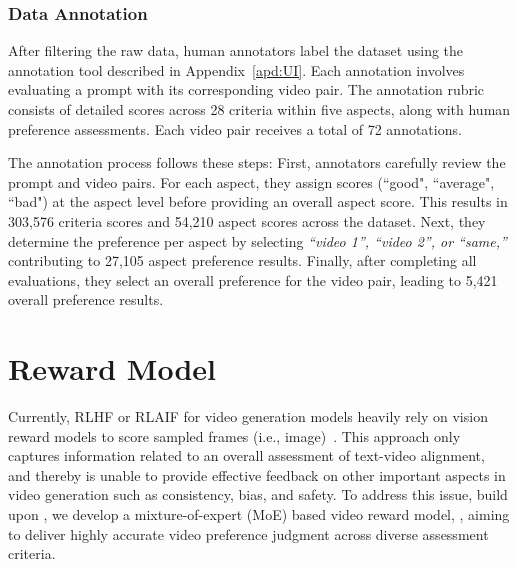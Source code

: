 





\subsubsection{Data Annotation}
After filtering the raw data, human annotators label the dataset using the annotation tool described in Appendix~\ref{apd:UI}. Each annotation involves evaluating a prompt with its corresponding video pair. The annotation rubric consists of detailed scores across 28 criteria within five aspects, along with human preference assessments. Each video pair receives a total of 72 annotations.  

The annotation process follows these steps: First, annotators carefully review the prompt and video pairs. For each aspect, they assign scores (``good", ``average", ``bad") at the aspect level before providing an overall aspect score. This results in 303,576 criteria scores and 54,210 aspect scores across the dataset. Next, they determine the preference per aspect by selecting \textit{``video 1'', ``video 2'', or ``same,''} contributing to 27,105 aspect preference results. Finally, after completing all evaluations, they select an overall preference for the video pair, leading to 5,421 overall preference results.  





\section{\algname Reward Model}
\label{sec:alg}

Currently, RLHF or RLAIF for video generation models heavily rely on vision reward models to score sampled frames (i.e., image)~\citep{Prabhudesai_Mendonca_Qin_Fragkiadaki_Pathak, Yuan_Zhang_Wang_Wei_Feng_Pan_Zhang_Liu_Albanie_Ni_2023}. 
This approach only captures information related to an overall assessment of text-video alignment, and thereby is unable to provide effective feedback on other important aspects in video generation such as consistency, bias, and safety. 
To address this issue, build upon \datasetname, we develop a mixture-of-expert (MoE) based video reward model, \algname, aiming to deliver highly accurate video preference judgment across diverse assessment criteria.

